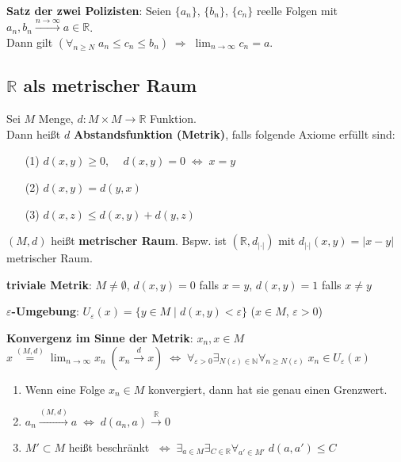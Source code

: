 \textbf{Satz der zwei Polizisten}: Seien $\{a_n\}$, $\{b_n\}$, $\{c_n\}$
reelle Folgen mit $a_n, b_n \xrightarrow{n \to \infty} a \in \mathbb{R}$. \\
Dann gilt
$(\forall_{n \ge N}\; a_n \le c_n \le b_n) \;\Rightarrow\;
\lim_{n \to \infty} c_n = a$.

\subsection{%
    \texorpdfstring{$\mathbb{R}$ als metrischer Raum}{ℝ als metrischer Raum}%
}

Sei $M$ Menge, $d: M \times M \rightarrow \mathbb{R}$ Funktion. \\
Dann heißt $d$ \textbf{Abstandsfunktion (Metrik)}, falls folgende Axiome
erfüllt sind:

\begin{itemize}
    \item[(1)] $d(x,y) \ge 0$, $\quad d(x,y) = 0 \;\Leftrightarrow\; x = y$
    \item[(2)] $d(x,y) = d(y,x)$
    \item[(3)] $d(x,z) \le d(x,y) + d(y,z)$
\end{itemize}

$(M,d)$ heißt \textbf{metrischer Raum}. Bspw. ist $(\mathbb{R},d_{|\cdot|})$
mit $d_{|\cdot|}(x,y) = |x - y|$ metrischer Raum.

\textbf{triviale Metrik}:
$M \not= \emptyset$, $d(x,y) = 0$ falls $x = y$, $d(x,y) = 1$ falls $x \not= y$

\textbf{$\varepsilon$-Umgebung}:
$U_\varepsilon(x) = \{y \in M \;|\; d(x,y) < \varepsilon\}$
($x \in M$, $\varepsilon > 0$)

\linie

\textbf{Konvergenz im Sinne der Metrik}: $x_n, x \in M$ \\
$x \overset{(M,d)}{=} \lim_{n \to \infty} x_n \; (x_n \xrightarrow{d} x)
\;\Leftrightarrow\;
\forall_{\varepsilon > 0} \exists_{N(\varepsilon) \in \mathbb{N}}
\forall_{n \ge N(\varepsilon)}\; x_n \in U_\varepsilon(x)$

\begin{enumerate}
    \item Wenn eine Folge $x_n \in M$
    konvergiert, dann hat sie genau einen Grenzwert.
    
    \item $a_n \xrightarrow{(M,d)} a \;\Leftrightarrow\;
    d(a_n, a) \xrightarrow{\mathbb{R}} 0$
    
    \item $M' \subset M$ heißt beschränkt $\;\Leftrightarrow\;
    \exists_{a \in M} \exists_{C \in \mathbb{R}} \forall_{a' \in M'}\;
    d(a, a') \le C$
\end{enumerate}

